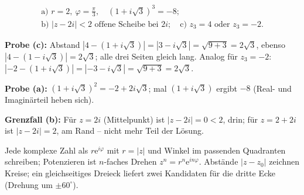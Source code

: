 \begin{ergebnis}
\begin{gather*}
  \text{a) } r=2,\ \varphi=\tfrac\pi3,\quad (1+i\sqrt3)^3=-8;\\
  \text{b) } |z-2i|<2 \text{ offene Scheibe bei }2i; \quad
  \text{c) } z_3=4 \text{ oder } z_3=-2 .
\end{gather*}
\end{ergebnis}

\begin{kontrolle}
\textbf{Probe (c):} Abstand $|4-(1+i\sqrt3)|=|3-i\sqrt3|=\sqrt{9+3}
=2\sqrt3$, ebenso $|4-(1-i\sqrt3)|=2\sqrt3$; alle drei Seiten gleich lang.
Analog für $z_3=-2$: $|-2-(1+i\sqrt3)|=|-3-i\sqrt3|=\sqrt{9+3}=2\sqrt3$.
\checkmark

\textbf{Probe (a):} $(1+i\sqrt3)^2=-2+2i\sqrt3$; mal $(1+i\sqrt3)$ ergibt
$-8$ (Real- und Imaginärteil heben sich). \checkmark

\textbf{Grenzfall (b):} Für $z=2i$ (Mittelpunkt) ist $|z-2i|=0<2$, drin; für
$z=2+2i$ ist $|z-2i|=2$, am Rand -- nicht mehr Teil der Lösung. \checkmark
\end{kontrolle}

\begin{merksatz}
Jede komplexe Zahl als $r\mathrm e^{i\varphi}$ mit $r=|z|$ und Winkel im
passenden Quadranten schreiben; Potenzieren ist $n$-faches Drehen
$z^n=r^n\mathrm e^{in\varphi}$. Abstände $|z-z_0|$ zeichnen Kreise; ein
gleichseitiges Dreieck liefert zwei Kandidaten für die dritte Ecke
(Drehung um $\pm60^\circ$).
\end{merksatz}
